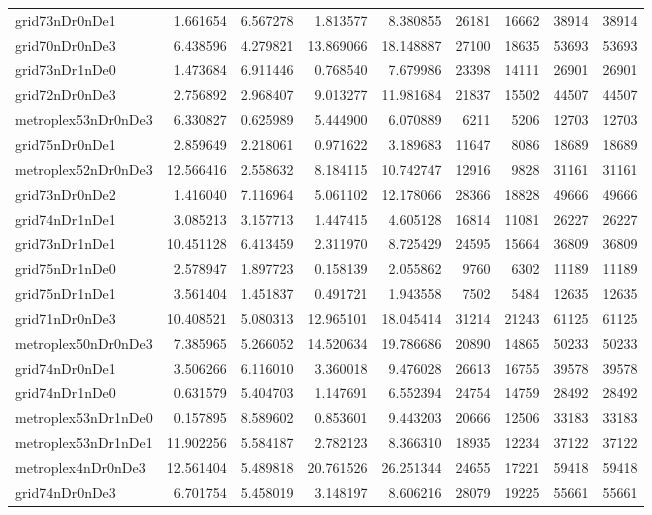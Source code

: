 \begin{longtable}{|l|r|r|r|r|r|r|r|r|}
grid73nDr0nDe1 & 1.661654 & 6.567278 & 1.813577 & 8.380855 & 26181 & 16662 & 38914 & 38914 \\
grid70nDr0nDe3 & 6.438596 & 4.279821 & 13.869066 & 18.148887 & 27100 & 18635 & 53693 & 53693 \\
grid73nDr1nDe0 & 1.473684 & 6.911446 & 0.768540 & 7.679986 & 23398 & 14111 & 26901 & 26901 \\
grid72nDr0nDe3 & 2.756892 & 2.968407 & 9.013277 & 11.981684 & 21837 & 15502 & 44507 & 44507 \\
metroplex53nDr0nDe3 & 6.330827 & 0.625989 & 5.444900 & 6.070889 & 6211 & 5206 & 12703 & 12703 \\
grid75nDr0nDe1 & 2.859649 & 2.218061 & 0.971622 & 3.189683 & 11647 & 8086 & 18689 & 18689 \\
metroplex52nDr0nDe3 & 12.566416 & 2.558632 & 8.184115 & 10.742747 & 12916 & 9828 & 31161 & 31161 \\
grid73nDr0nDe2 & 1.416040 & 7.116964 & 5.061102 & 12.178066 & 28366 & 18828 & 49666 & 49666 \\
grid74nDr1nDe1 & 3.085213 & 3.157713 & 1.447415 & 4.605128 & 16814 & 11081 & 26227 & 26227 \\
grid73nDr1nDe1 & 10.451128 & 6.413459 & 2.311970 & 8.725429 & 24595 & 15664 & 36809 & 36809 \\
grid75nDr1nDe0 & 2.578947 & 1.897723 & 0.158139 & 2.055862 & 9760 & 6302 & 11189 & 11189 \\
grid75nDr1nDe1 & 3.561404 & 1.451837 & 0.491721 & 1.943558 & 7502 & 5484 & 12635 & 12635 \\
grid71nDr0nDe3 & 10.408521 & 5.080313 & 12.965101 & 18.045414 & 31214 & 21243 & 61125 & 61125 \\
metroplex50nDr0nDe3 & 7.385965 & 5.266052 & 14.520634 & 19.786686 & 20890 & 14865 & 50233 & 50233 \\
grid74nDr0nDe1 & 3.506266 & 6.116010 & 3.360018 & 9.476028 & 26613 & 16755 & 39578 & 39578 \\
grid74nDr1nDe0 & 0.631579 & 5.404703 & 1.147691 & 6.552394 & 24754 & 14759 & 28492 & 28492 \\
metroplex53nDr1nDe0 & 0.157895 & 8.589602 & 0.853601 & 9.443203 & 20666 & 12506 & 33183 & 33183 \\
metroplex53nDr1nDe1 & 11.902256 & 5.584187 & 2.782123 & 8.366310 & 18935 & 12234 & 37122 & 37122 \\
metroplex4nDr0nDe3 & 12.561404 & 5.489818 & 20.761526 & 26.251344 & 24655 & 17221 & 59418 & 59418 \\
grid74nDr0nDe3 & 6.701754 & 5.458019 & 3.148197 & 8.606216 & 28079 & 19225 & 55661 & 55661 \\

\end{longtable}
